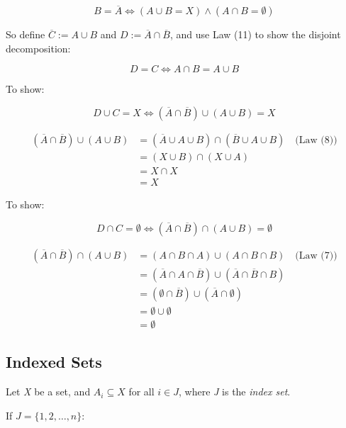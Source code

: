 \[
	B = \overline{A} \iff (A \cup B = X) \land (A \cap B = \emptyset)
\]

So define \( \overline{C} := A \cup B \) and \( D := \overline{A} \cap \overline{B} \),
and use Law (11) to show the disjoint decomposition:

\[
	D = C \iff A \cap B = A \cup B
\]

To show:

\[
	D \cup C = X \iff (\overline{A} \cap \overline{B}) \cup (A \cup B) = X
\]

\begin{align*}
	(\overline{A} \cap \overline{B}) \cup (A \cup B)
	 & = (\overline{A} \cup A \cup B) \cap (\overline{B} \cup A \cup B) \quad \text{(Law (8))} \\
	 & = (X \cup B) \cap (X \cup A)                                                            \\
	 & = X \cap X                                                                              \\
	 & = X
\end{align*}

To show:

\[
	D \cap C = \emptyset \iff (\overline{A} \cap \overline{B}) \cap (A \cup B) = \emptyset
\]

\begin{align*}
	(\overline{A} \cap \overline{B}) \cap (A \cup B)
	 & = (A \cap B \cap A) \cup (A \cap B \cap B) \quad \text{(Law (7))}                      \\
	 & = (\overline{A} \cap A \cap \overline{B}) \cup (\overline{A} \cap \overline{B} \cap B) \\
	 & = (\emptyset \cap \overline{B}) \cup (\overline{A} \cap \emptyset)                     \\
	 & = \emptyset \cup \emptyset                                                             \\
	 & = \emptyset
\end{align*}

\QED

\subsection{Indexed Sets}

Let \emph{X} be a set, and \( A_i \subseteq X \) for all \( i \in J \), where \emph{J} is the 
\emph{index set}.
\vspace{\baselineskip}

If \( J = \{1, 2, \dots, n\} \):

